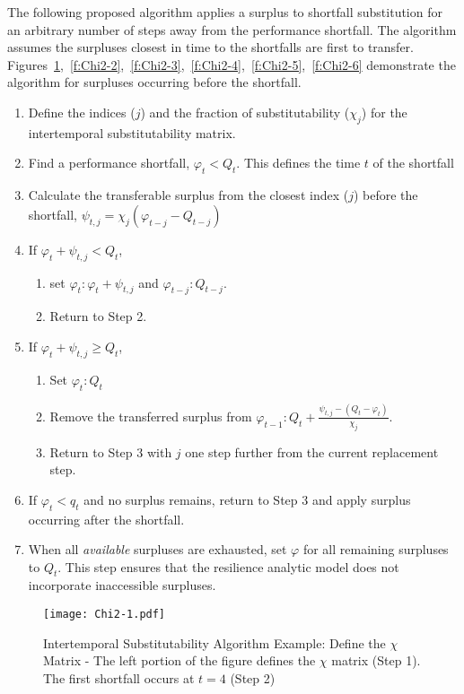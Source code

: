 \documentclass[preprint,12pt]{elsarticle}
\begin{document}
\noindent  The following proposed algorithm applies a
surplus to shortfall substitution for an arbitrary number of steps away from the performance
shortfall. The algorithm assumes the surpluses closest in time to the
shortfalls are first to
transfer. Figures~\ref{f:Chi2-1},~\ref{f:Chi2-2},~\ref{f:Chi2-3},~\ref{f:Chi2-4},~\ref{f:Chi2-5},~\ref{f:Chi2-6}
demonstrate the 
algorithm for surpluses 
occurring before the shortfall. 

\begin{enumerate}
\item Define the indices ($j$) and the fraction of substitutability
  ($\chi_j$) for the intertemporal substitutability matrix.
\item Find a performance shortfall, $\varphi_t < Q_t$. This defines
  the time $t$ of the shortfall 
\item Calculate the transferable surplus from the closest index ($j$) before the
  shortfall, $\psi_{t,j} = \chi_{j}(\varphi_{t-j}-Q_{t-j})$
\item If $\varphi_t + \psi_{t,j} < Q_t$,
  \begin{enumerate}
  \item set $\varphi_t:\varphi_t + \psi_{t,j}$ and
    $\varphi_{t-j}:Q_{t-j}$.
  \item Return to Step 2.
  \end{enumerate}
\item If $\varphi_t + \psi_{t,j} \geq Q_t$,
  \begin{enumerate}
  \item Set $\varphi_t:Q_t$
  \item Remove the transferred surplus from
    $\varphi_{t-1} : Q_t + \frac{\psi_{t,j} - (Q_t -
    \varphi_t)}{\chi_{j}}$.
  \item  Return to Step 3 with $j$ one step further from the current
    replacement step.
  \end{enumerate}
\item If $\varphi_t<q_t$ and no surplus remains, return to Step 3
  and apply surplus occurring after the shortfall.
\item When all \emph{available} surpluses are exhausted, set $\varphi$
  for all remaining surpluses to $Q_t$. This step ensures that
  the resilience analytic model does not incorporate inaccessible surpluses. 
\end{enumerate}
    

 
\begin{figure}[h]
  \centering\texttt{[image: Chi2-1.pdf]}
  \caption{Intertemporal Substitutability Algorithm Example: Define
    the $\chi$ Matrix - The left portion of the figure defines
    the $\chi$ matrix (Step 1). The first shortfall occurs at
    $t=4$ (Step 2)}
  \label{f:Chi2-1}
\end{figure}
\end{document}
